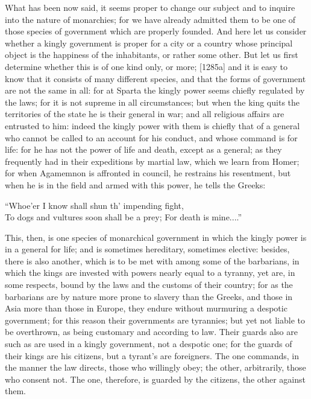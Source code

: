 
What has been now said, it seems proper to change our subject and to
inquire into the nature of monarchies; for we have already admitted them
to be one of those species of government which are properly founded. And
here let us consider whether a kingly government is proper for a city or a
country whose principal object is the happiness of the inhabitants, or
rather some other. But let us first determine whether this is of one kind
only, or more; [1285a] and it is easy to know that it consists of many
different species, and that the forms of government are not the same in
all: for at Sparta the kingly power seems chiefly regulated by the laws;
for it is not supreme in all circumstances; but when the king quits the
territories of the state he is their general in war; and all religious
affairs are entrusted to him: indeed the kingly power with them is chiefly
that of a general who cannot be called to an account for his conduct, and
whose command is for life: for he has not the power of life and death,
except as a general; as they frequently had in their expeditions by
martial law, which we learn from Homer; for when Agamemnon is affronted in
council, he restrains his resentment, but when he is in the field and
armed with this power, he tells the Greeks:

``Whoe'er I know shall shun th' impending fight,\\
To dogs and vultures soon shall be a prey; For death is mine....''

This, then, is one species of monarchical government in which the kingly
power is in a general for life; and is sometimes hereditary, sometimes
elective: besides, there is also another, which is to be met with among
some of the barbarians, in which the kings are invested with powers nearly
equal to a tyranny, yet are, in some respects, bound by the laws and the
customs of their country; for as the barbarians are by nature more prone
to slavery than the Greeks, and those in Asia more than those in Europe,
they endure without murmuring a despotic government; for this reason their
governments are tyrannies; but yet not liable to be overthrown, as being
customary and according to law. Their guards also are such as are used in
a kingly government, not a despotic one; for the guards of their kings are
his citizens, but a tyrant's are foreigners. The one commands, in the
manner the law directs, those who willingly obey; the other, arbitrarily,
those who consent not. The one, therefore, is guarded by the citizens, the
other against them.

